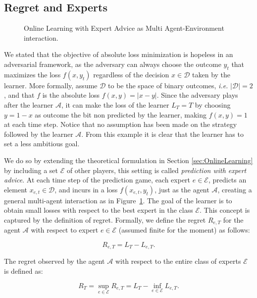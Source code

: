 \subsection{Regret and Experts}\label{sec:regret_and_experts}
\begin{figure}[!ht]
\centering

\caption{Online Learning with Expert Advice as Multi Agent-Environment interaction.}
\label{fig:OL}
\end{figure}

We stated that the objective of absolute loss minimization is hopeless in an adversarial framework, as the adversary can always choose the outcome $y_t$ that maximizes the loss $f(x,y_t)$ regardless of the decision $x\in\mathcal D$ taken by the learner. More formally, assume $\mathcal D$ to be the space of binary outcomes, \emph{i.e.} $|\mathcal D|=2$, and that $f$ is the absolute loss $f(x,y)=|x - y|$. Since the adversary plays after the learner $\mathcal A$, it can  make the loss of the learner $L_T=T$ by choosing $y=1-x$ as outcome the bit non predicted by the learner, making $f(x,y)=1$ at each time step. Notice that no assumption has been made on the strategy followed by the learner $\mathcal A$.
From this example it is clear that the learner has to set a less ambitious goal.

We do so by extending the theoretical formulation in Section \ref{sec:OnlineLearning} by including a set $\mathcal E$ of other players, this setting is called \emph{prediction with expert advice}. At each time step of the prediction game, each expert $e\in\mathcal E$, predicts an element $x_{e,t}\in\mathcal D$, and incurs in a loss $f(x_{e,t},y_t)$, just as the agent $\mathcal A$, creating a general multi-agent interaction as in Figure~\ref{fig:OL}. 
The goal of the learner is to obtain small losses with respect to the best expert in the class $\mathcal E$. This concept is captured by the definition of regret.
Formally, we define the regret $R_{e,T}$ for the agent $\mathcal A$ with respect to expert $e\in\mathcal E$ (assumed finite for the moment) as follows:

\begin{equation}\label{def:Regret}
	R_{e,T} = L_T-L_{e,T}.
\end{equation}

The regret observed by the agent $\mathcal A$ with respect to the entire class of experts $\mathcal E$ is defined as:

\begin{equation}
	R_T=\sup\limits_{e\in\mathcal E}R_{e,T}=L_T-\inf\limits_{e\in\mathcal E}L_{e,T}.
\end{equation}

